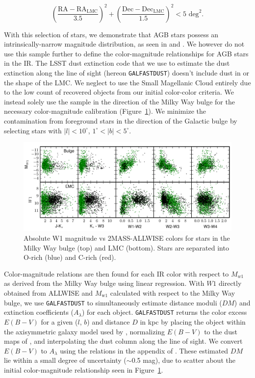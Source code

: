 $$\displaystyle\left(\frac{\text{RA} - \text{RA}_\text{LMC}}{3.5}\right)^2 + \left(\frac{\text{Dec} - \text{Dec}_\text{LMC}}{1.5} \right)^2 < 5 \text{ deg}^2.$$

\noindent With this selection of stars, we demonstrate that AGB stars possess an intrinsically-narrow magnitude distribution, as seen in \cite{1985A&A...152L...1H} and \cite{2002MNRAS.337..749J}. We however do not use this sample further to define the color-magnitude relationships for AGB stars in the IR. The LSST dust extinction code that we use to estimate the dust extinction along the line of sight (hereon {\tt GALFASTDUST}) doesn't include dust in or the shape of the LMC. We neglect to use the Small Magellanic Cloud entirely due to the low count of recovered objects from our initial color-color criteria.  We instead solely use the sample in the direction of the Milky Way bulge for the necessary color-magnitude calibration (Figure~\ref{fig:colormag}). We minimize the contamination from foreground stars in the direction of the Galactic bulge by selecting stars with $\lvert l\rvert < 10^\circ$, $1^\circ < \lvert b \rvert < 5^\circ$. 

\begin{figure}[h]
\includegraphics[width=6in]{figs/bulge_lmc_colormag.pdf}
\caption{{\footnotesize Absolute W1 magnitude vs 2MASS-ALLWISE colors for stars in the Milky Way bulge (top) and LMC (bottom). Stars are separated into O-rich (blue) and C-rich (red).}}
\label{fig:colormag}
\end{figure}

Color-magnitude relations are then found for each IR color with respect to $M_{w1}$ as derived from the Milky Way bulge using linear regression. With $W1$ directly obtained from ALLWISE and $M_\text{w1}$ calculated with respect to the Milky Way bulge, we use {\tt GALFASTDUST} to simultaneously estimate distance moduli ($DM$) and extinction coefficients ($A_\lambda$) for each object. {\tt GALFASTDUST} returns the color excess $E(B-V)$ for a given ($l$, $b$) and distance $D$ in kpc by placing the object within the axisymmetric galaxy model used by \cite{2005AJ....130..659A}, normalizing $E(B-V)$ to the dust maps of \cite{1998ApJ...500..525S}, and interpolating the dust column along the line of sight. We convert $E(B-V)$ to $A_\lambda$ using the relations in the appendix of \cite{2014MNRAS.440.3430D}. These estimated $DM$ lie within a small degree of uncertainty ($\sim$0.5 mag), due to scatter about the initial color-magnitude relationship seen in Figure~\ref{fig:colormag}.

